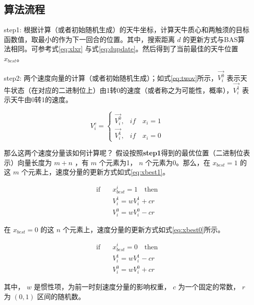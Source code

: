 \documentclass[]{ctexbook}
\begin{document}
\subsection{算法流程}

step1:
根据计算（或者初始随机生成）的天牛坐标，计算天牛质心和两触须的目标函数值，取最小的作为下一回合的位置。其中，搜索距离
\(d\) 的更新方式与BAS算法相同。可参考式\eqref{eq:xlxr}
与式\eqref{eq:dupdate}。然后得到了当前最佳的天牛位置 \(x_{best}\)。

step2:
两个速度向量的计算（或者初始随机生成）；如式\eqref{eq:twov}所示，\(\overrightarrow{V_i^0}\)
表示天牛状态（在对应的二进制位上）由1转0的速度（或者称之为可能性，概率），\(\overrightarrow{V_i^1}\)
表示天牛由0转1的速度。

\begin{equation}
V_i^c = \begin{cases} 
\overrightarrow{V_i^0}, & if\quad x_i = 1 \\ 
\overrightarrow{V_i^1}, & if\quad x_i = 0
\end{cases}
\label{eq:twov}
\end{equation}

那么这两个速度分量该如何计算呢？
假设按照\textbf{step1}得到的最优位置（二进制位表示）向量长度为 \(m+n\)
，有 \(m\) 个元素为1， \(n\) 个元素为0。那么，在 \(x_{best}=1\) 的这
\(m\) 个元素上，速度分量的更新方式如式\eqref{eq:xbest1}。

\begin{equation}
\begin{split}
\text{if}\quad & x_{best}^i = 1\quad \text{then}\\
&V_i^1 = wV_i^1+cr\\
&V_i^0 = wV_i^0-cr
\end{split}
\label{eq:xbest1}
\end{equation}

在 \(x_{best}=0\) 的这 \(n\)
个元素上，速度分量的更新方式如式\eqref{eq:xbest0}所示。

\begin{equation}
\begin{split}
\text{if}\quad & x_{best}^i = 0\quad \text{then}\\
&V_i^1 = wV_i^1-cr\\
&V_i^0 = wV_i^0+cr
\end{split}
\label{eq:xbest0}
\end{equation}

其中， \(w\) 是惯性项，为前一时刻速度分量的影响权重， \(c\)
为一个固定的常数， \(r\) 为 \((0,1)\) 区间的随机数。
\end{document}
